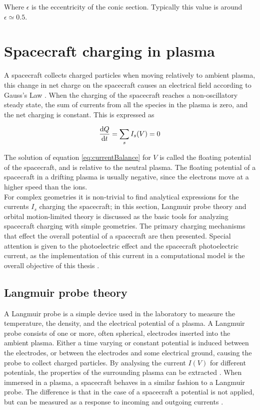 Where $\epsilon$ is the eccentricity of the conic section. Typically this value is around $\epsilon \simeq 0.5$.

\section{Spacecraft charging in plasma}
A spacecraft collects charged particles when moving relatively to ambient plasma, this change in net charge on the spacecraft causes an electrical field according to Gauss's Law . When the charging of the spacecraft reaches a non-oscillatory steady state, the sum of currents from all the species in the plasma is zero, and the net charging is constant. This is expressed as 

\begin{equation} \label{eq:currentBalance}
    \dv{Q}{t} = \sum_s I_s(V) = 0
\end{equation}

The solution of equation \ref{eq:currentBalance} for $V$ is called the floating potential of the spacecraft, and is relative to the neutral plasma. The floating potential of a spacecraft in a drifting plasma is usually negative, since the electrons move at a higher speed than the ions.
\\
For complex geometries it is non-trivial to find analytical expressions for the currents $I_s$ charging the spacecraft; in this section, Langmuir probe theory and orbital motion-limited theory is discussed as the basic tools for analyzing spacecraft charging with simple geometries. The primary charging mechanisms that effect the overall potential of a spacecraft are then presented. Special attention is given to the photoelectric effect and the spacecraft photoelectric current, as the implementation of this current in a computational model is the overall objective of this thesis .


\subsection{Langmuir probe theory}
A Langmuir probe is a simple device used in the laboratory to measure the temperature, the density, and the electrical potential of a plasma. A Langmuir probe consists of one or more, often spherical, electrodes inserted into the ambient plasma. Either a time varying or constant potential is induced between the electrodes, or between the electrodes and some electrical ground, causing the probe to collect charged particles. By analysing the current $I(V)$ for different potentials, the properties of the surrounding plasma can be extracted . When immersed in a plasma, a spacecraft behaves in a similar fashion to a Langmuir probe. The difference is that in the case of a spacecraft a potential is not applied, but can be measured as a response to incoming and outgoing currents . 


